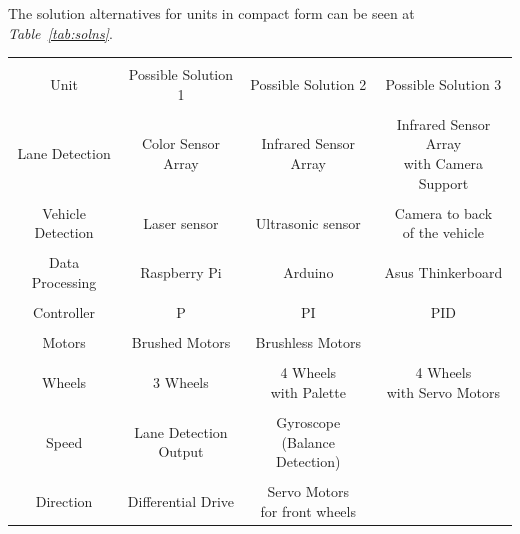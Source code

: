 \documentclass[a4paper,12pt]{article}
\begin{document}
		The solution alternatives for units in compact form can be seen at \textit{Table~\ref{tab:solns}}.
	
\begin{table}[H]
  \centering
 
    \begin{tabular}{| c | c  c  c |}
    \hline 
    	&&& \\
       Unit & Possible Solution 1 & Possible Solution 2  & Possible Solution 3 \\ \hline
       &&& \\
       Lane Detection  & Color Sensor Array & Infrared Sensor Array & \specialcell{ Infrared Sensor  Array \\ with  Camera Support}  \\
       \hline 
       &&& \\
       Vehicle Detection & Laser sensor  & Ultrasonic sensor & \specialcell{Camera to back \\of the vehicle } \\

       \hline 
       &&& \\
       Data Processing & Raspberry Pi & Arduino & Asus Thinkerboard \\ 
       \hline 
       &&& \\
       Controller & P & PI & PID \\ 
       \hline 
       &&& \\
       Motors & Brushed Motors & Brushless Motors & \\
       \hline 
       &&& \\
		Wheels & 3 Wheels  &  \specialcell{4 Wheels \\with Palette}  & \specialcell{4 Wheels \\with Servo Motors}   \\
		\hline 
		&&& \\
		Speed & \specialcell{Lane Detection \\Output} & \specialcell{Gyroscope \\(Balance Detection)}  & \\
		\hline 
		&&& \\
		Direction & Differential Drive & \specialcell{Servo Motors \\ for front wheels}   &
       

\end{tabular}
\end{table}
\end{document}
